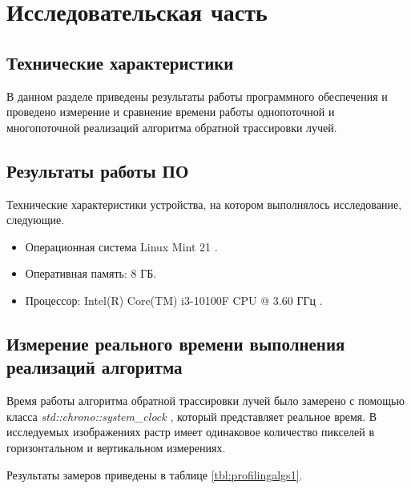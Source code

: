 \chapter{Исследовательская часть}

\section{Технические характеристики}

В данном разделе  приведены результаты работы программного обеспечения и проведено измерение и сравнение времени работы  однопоточной и многопоточной реализаций алгоритма обратной трассировки лучей.

\section{Результаты работы ПО}

Технические характеристики устройства, на котором выполнялось исследование, следующие.

\begin{itemize}
	\item Операционная система Linux Mint 21 \cite{linux}.
	\item Оперативная память: 8 ГБ.
	\item Процессор: Intel(R) Core(TM) i3-10100F CPU @ 3.60 ГГц \cite{intel}.
\end{itemize}

\section{Измерение реального времени выполнения реализаций алгоритма}

Время работы алгоритма обратной трассировки лучей было замерено
с помощью класса \textit{std::chrono::system\_clock} \cite{isocplusplus}, который представляет реальное время. В исследуемых изображениях растр имеет одинаковое количество пикселей в горизонтальном и вертикальном измерениях.

Результаты замеров приведены в таблице \ref{tbl:profilingalgs1}.

